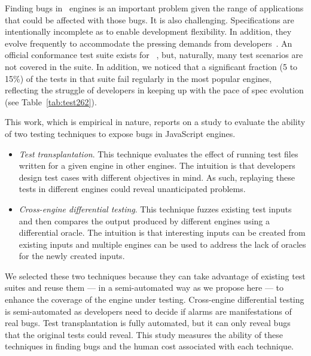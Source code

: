 \documentclass[smallextended]{svjour3}
\begin{document}
Finding bugs in \js\ engines is an important problem given the range
of applications that could be affected with those bugs. It is also
challenging.  Specifications are intentionally incomplete as to enable
development flexibility. In addition, they evolve frequently to
accommodate the pressing demands from
developers~\cite{ecmas262-spec-repo}. An official conformance test
suite exists for \js~\cite{tc39-github}, but, naturally, many test
scenarios are not covered in the suite. In addition, we noticed that a
significant fraction (5 to 15\%) of the tests in that suite fail
regularly in the most popular engines, reflecting the struggle of developers in keeping
up with the pace of spec evolution (see Table~\ref{tab:test262}).

This work, which is empirical in nature, reports on a study to evaluate
the ability of two testing techniques to expose bugs in JavaScript engines.

\begin{itemize}[topsep=0pt,parsep=0pt,partopsep=2pt,labelwidth=0cm,align=left,itemindent=-0.25cm]
\item \emph{Test transplantation}.
  This technique evaluates the effect of running test files
  written for a given engine in other engines. The intuition is that
  developers design test cases with different objectives in mind. As
  such, replaying these tests in different engines could reveal
  unanticipated problems.

\item \emph{Cross-engine differential testing}.  This technique fuzzes
  existing test inputs~\cite{fuzz-testing-history} and then compares
  the output produced by different engines using a differential
  oracle. The intuition is that interesting inputs can be created from
  existing inputs and multiple engines can be used to address the lack
  of oracles for the newly created inputs.
\end{itemize}

We selected these two techniques because they can take advantage
of existing test suites and reuse them --- in a semi-automated way
as we propose here --- to enhance the coverage of the engine under testing.
Cross-engine differential testing is semi-automated as
developers need to decide if alarms are manifestations of real
bugs. Test transplantation is fully automated, but it can only reveal
bugs that the original tests could reveal. This study measures the
ability of these techniques in finding bugs and the human cost
associated with each technique.
\end{document}
